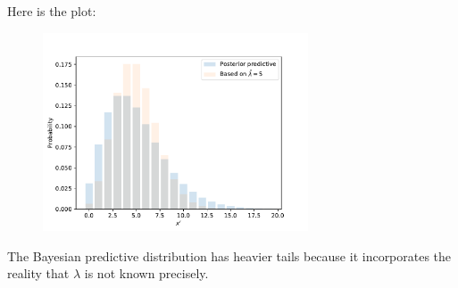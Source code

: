 \documentclass[a4paper, 12pt]{article}
\begin{document}
Here is the plot:

\begin{figure}[!ht]
\centering
\includegraphics[width=0.7\textwidth]{predictive.pdf}
\end{figure}

The Bayesian predictive distribution has heavier tails because
it incorporates the reality that $\lambda$ is not known
precisely.
\end{document}
